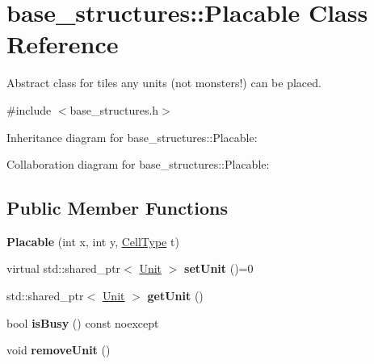 \hypertarget{classbase__structures_1_1Placable}{}\section{base\+\_\+structures\+:\+:Placable Class Reference}
\label{classbase__structures_1_1Placable}


Abstract class for tiles any units (not monsters!) can be placed.  




{\ttfamily \#include $<$base\+\_\+structures.\+h$>$}



Inheritance diagram for base\+\_\+structures\+:\+:Placable\+:


Collaboration diagram for base\+\_\+structures\+:\+:Placable\+:
\subsection*{Public Member Functions}
\begin{DoxyCompactItemize}
\item 
\mbox{\label{classbase__structures_1_1Placable_a7caae270ca49d3830e8aa4a3a46f1e19}} 
{\bfseries Placable} (int x, int y, \hyperlink{group__map__interface_ga7a79b122dbd494c4eea32680c5df34c1}{Cell\+Type} t)
\item 
\mbox{\label{classbase__structures_1_1Placable_a177f8b1b10c7340f85d02a0ce1f507c7}} 
virtual std\+::shared\+\_\+ptr$<$ \hyperlink{classbase__structures_1_1Unit}{Unit} $>$ {\bfseries set\+Unit} ()=0
\item 
\mbox{\label{classbase__structures_1_1Placable_a18da0a1dc458642db255f4e1151d4a19}} 
std\+::shared\+\_\+ptr$<$ \hyperlink{classbase__structures_1_1Unit}{Unit} $>$ {\bfseries get\+Unit} ()
\item 
\mbox{\label{classbase__structures_1_1Placable_acefdcb26351b589832cda9d8e3666353}} 
bool {\bfseries is\+Busy} () const noexcept
\item 
\mbox{\label{classbase__structures_1_1Placable_a85244a618fc825f189b8c76026189929}} 
void {\bfseries remove\+Unit} ()
\end{DoxyCompactItemize}
